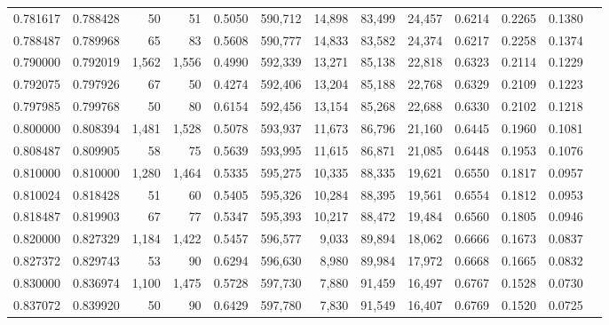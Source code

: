 \begin{tabular}{rrrrrrrrrrrrr}
0.781617 & 0.788428 &     50 &    51 &                                     0.5050 & 590,712 &  14,898 &  83,499 &  24,457 & 0.6214 & 0.2265 & 0.1380 \\
0.788487 & 0.789968 &     65 &    83 &                                     0.5608 & 590,777 &  14,833 &  83,582 &  24,374 & 0.6217 & 0.2258 & 0.1374 \\
0.790000 & 0.792019 &  1,562 & 1,556 &                                     0.4990 & 592,339 &  13,271 &  85,138 &  22,818 & 0.6323 & 0.2114 & 0.1229 \\
0.792075 & 0.797926 &     67 &    50 &                                     0.4274 & 592,406 &  13,204 &  85,188 &  22,768 & 0.6329 & 0.2109 & 0.1223 \\
0.797985 & 0.799768 &     50 &    80 &                                     0.6154 & 592,456 &  13,154 &  85,268 &  22,688 & 0.6330 & 0.2102 & 0.1218 \\
0.800000 & 0.808394 &  1,481 & 1,528 &                                     0.5078 & 593,937 &  11,673 &  86,796 &  21,160 & 0.6445 & 0.1960 & 0.1081 \\
0.808487 & 0.809905 &     58 &    75 &                                     0.5639 & 593,995 &  11,615 &  86,871 &  21,085 & 0.6448 & 0.1953 & 0.1076 \\
0.810000 & 0.810000 &  1,280 & 1,464 &                                     0.5335 & 595,275 &  10,335 &  88,335 &  19,621 & 0.6550 & 0.1817 & 0.0957 \\
0.810024 & 0.818428 &     51 &    60 &                                     0.5405 & 595,326 &  10,284 &  88,395 &  19,561 & 0.6554 & 0.1812 & 0.0953 \\
0.818487 & 0.819903 &     67 &    77 &                                     0.5347 & 595,393 &  10,217 &  88,472 &  19,484 & 0.6560 & 0.1805 & 0.0946 \\
0.820000 & 0.827329 &  1,184 & 1,422 &                                     0.5457 & 596,577 &   9,033 &  89,894 &  18,062 & 0.6666 & 0.1673 & 0.0837 \\
0.827372 & 0.829743 &     53 &    90 &                                     0.6294 & 596,630 &   8,980 &  89,984 &  17,972 & 0.6668 & 0.1665 & 0.0832 \\
0.830000 & 0.836974 &  1,100 & 1,475 &                                     0.5728 & 597,730 &   7,880 &  91,459 &  16,497 & 0.6767 & 0.1528 & 0.0730 \\
0.837072 & 0.839920 &     50 &    90 &                                     0.6429 & 597,780 &   7,830 &  91,549 &  16,407 & 0.6769 & 0.1520 & 0.0725 \\

\end{tabular}
